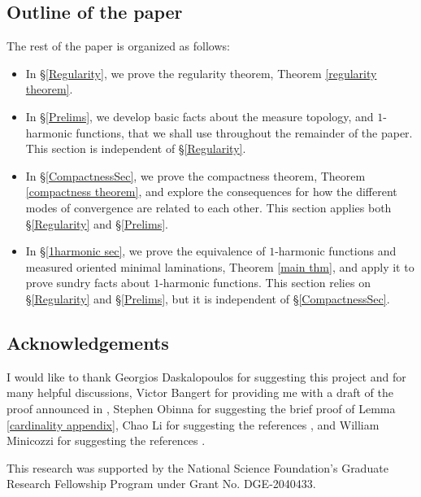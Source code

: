 \documentclass[reqno,11pt]{amsart}
\theoremstyle{definition}
\numberwithin{equation}{section}
\begin{document}
\subsection{Outline of the paper}
The rest of the paper is organized as follows:
\begin{itemize}
\item In \S\ref{Regularity}, we prove the regularity theorem, Theorem \ref{regularity theorem}.
\item In \S\ref{Prelims}, we develop basic facts about the measure topology, and $1$-harmonic functions, that we shall use throughout the remainder of the paper. This section is independent of \S\ref{Regularity}.
\item In \S\ref{CompactnessSec}, we prove the compactness theorem, Theorem \ref{compactness theorem}, and explore the consequences for how the different modes of convergence are related to each other. This section applies both \S\ref{Regularity} and \S\ref{Prelims}.
\item In \S\ref{1harmonic sec}, we prove the equivalence of $1$-harmonic functions and measured oriented minimal laminations, Theorem \ref{main thm}, and apply it to prove sundry facts about $1$-harmonic functions. This section relies on \S\ref{Regularity} and \S\ref{Prelims}, but it is independent of \S\ref{CompactnessSec}.
\end{itemize}


\subsection{Acknowledgements}
I would like to thank Georgios Daskalopoulos for suggesting this project and for many helpful discussions, Victor Bangert for providing me with a draft of the proof announced in \cite{Auer01}, Stephen Obinna for suggesting the brief proof of Lemma \ref{cardinality appendix}, Chao Li for suggesting the references \cite{Chodosh2021,chodosh2022complete}, and William Minicozzi for suggesting the references \cite{Schoen75, Schoen81}.

This research was supported by the National Science Foundation's Graduate Research Fellowship Program under Grant No. DGE-2040433.





\end{document}
